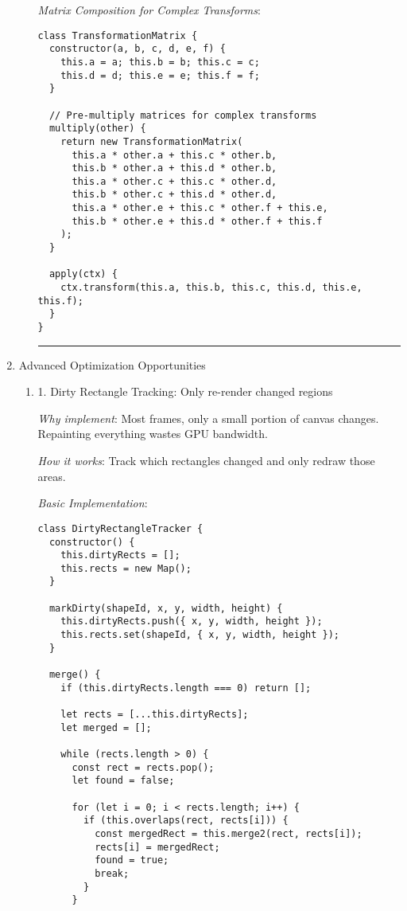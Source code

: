 \documentclass[11pt]{article}
\begin{document}
\begin{enumerate}
\begin{enumerate}
\emph{Matrix Composition for Complex Transforms}:
\begin{verbatim}
class TransformationMatrix {
  constructor(a, b, c, d, e, f) {
    this.a = a; this.b = b; this.c = c;
    this.d = d; this.e = e; this.f = f;
  }
  
  // Pre-multiply matrices for complex transforms
  multiply(other) {
    return new TransformationMatrix(
      this.a * other.a + this.c * other.b,
      this.b * other.a + this.d * other.b,
      this.a * other.c + this.c * other.d,
      this.b * other.c + this.d * other.d,
      this.a * other.e + this.c * other.f + this.e,
      this.b * other.e + this.d * other.f + this.f
    );
  }
  
  apply(ctx) {
    ctx.transform(this.a, this.b, this.c, this.d, this.e, this.f);
  }
}
\end{verbatim}

\noindent\rule{\textwidth}{0.5pt}
\end{enumerate}
\item Advanced Optimization Opportunities
\label{sec:org4180f32}

\begin{enumerate}
\item 1. Dirty Rectangle Tracking: Only re-render changed regions
\label{sec:org5e0f0ae}

\emph{Why implement}: Most frames, only a small portion of canvas changes. Repainting everything wastes GPU bandwidth.

\emph{How it works}: Track which rectangles changed and only redraw those areas.

\emph{Basic Implementation}:
\begin{verbatim}
class DirtyRectangleTracker {
  constructor() {
    this.dirtyRects = [];
    this.rects = new Map();
  }
  
  markDirty(shapeId, x, y, width, height) {
    this.dirtyRects.push({ x, y, width, height });
    this.rects.set(shapeId, { x, y, width, height });
  }
  
  merge() {
    if (this.dirtyRects.length === 0) return [];
    
    let rects = [...this.dirtyRects];
    let merged = [];
    
    while (rects.length > 0) {
      const rect = rects.pop();
      let found = false;
      
      for (let i = 0; i < rects.length; i++) {
        if (this.overlaps(rect, rects[i])) {
          const mergedRect = this.merge2(rect, rects[i]);
          rects[i] = mergedRect;
          found = true;
          break;
        }
      }
      

\end{verbatim}
\end{enumerate}
\end{enumerate}
\end{document}
